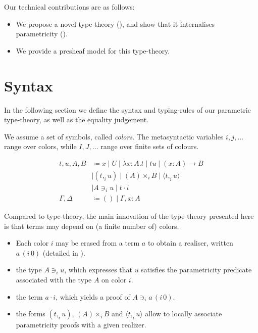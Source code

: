 \documentclass[english]{PaperTools/latex/lipics}
\newcommand\CP[3]{(#2,_{#1} #3)}
\newcommand\CTimes[2]{(#2) ×_{#1}}
\newcommand\param[1]{\!\cdot\!#1}
\newcommand\op[1]{∋_{#1}}
\newcommand\fp[3]{⟨#2 ,_{#1} #3⟩}
\newcommand\mor[2]{({#1}\,{#2})}
\newcommand\proj[2]{{#2}\,\mor{#1}0}
\newcommand\comment[1]{}
\begin{document}
Our technical contributions are as follows:
\begin{itemize}
\item We propose a novel type-theory (), and show
  that it internalises parametricity ().
\item We provide a presheaf model for this type-theory. 
\end{itemize}

\section{Syntax}
\label{sec:syntax}
In the following section we define the syntax and typing-rules of our
parametric type-theory, as well as the equality judgement.

We assume a set of symbols, called \emph{colors}.
The metasyntactic variables $i,j,\ldots$ range over colors, while
$I,J,…$ range over finite sets of colours.

\begin{definition}
  \begin{align*}
    t,u,A,B & \coloneqq x \mid U \mid λx:A. t      \mid t u \mid (x:A) → B \\
            & \mid \CP i t u  \mid \CTimes i A B  \mid \fp i t u \\
            & \mid A \op i u \mid t \param i  \\
    \Gamma,\Delta & \coloneqq () \mid \Gamma,x:A
  \end{align*}
\end{definition}

Compared to type-theory, the main innovation of the type-theory
presented here is that terms may depend on (a finite number of)
colors.

\begin{itemize}
\item Each color $i$ may be erased from a term $a$ to obtain a realiser, written $\proj i a$ (detailed in ).
\item the type $A \op i u$, which expresses that $u$ satisfies the
  parametricity predicate associated with the type $A$ on color $i$.
\item the term $a \param i$, which yields a proof of $A \op i \proj i a$.
\item the forms $\CP i t u$, $\CTimes i A B$ and $\fp i t u$ allow to
  locally associate parametricity proofs with a given realizer.
\end{itemize}
\end{document}
